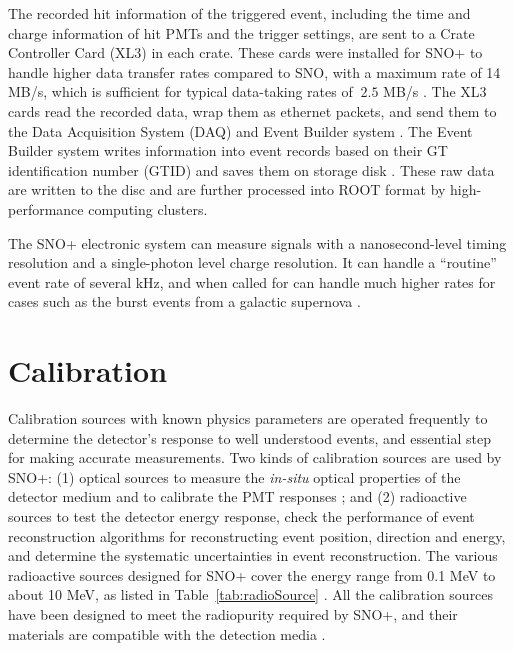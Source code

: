The recorded hit information of the triggered event, including the time and charge information of hit PMTs and the trigger settings, are sent to a Crate Controller Card (XL3) in each crate. These cards were installed for SNO+ to handle higher data transfer rates compared to SNO, with a maximum rate of 14 MB/s, which is sufficient for typical data-taking rates of $~2.5$ MB/s \cite{bonventre2014neutron,rumleskie2021sno+}. The XL3 cards read the recorded data, wrap them as ethernet packets, and send them to the Data Acquisition System (DAQ) and Event Builder system \cite{walker2016study}. The Event Builder system writes information into event records based on their GT identification number (GTID) and saves them on storage disk \cite{snop_jinst}. These raw data are written to the disc and are further processed into ROOT format by high-performance computing clusters.

The SNO+ electronic system can measure signals with a nanosecond-level timing resolution and a single-photon level charge resolution. It can handle a ``routine'' event rate of several kHz, and when called for can handle much higher rates for cases such as the burst events from a galactic supernova \cite{snop_jinst}.

\section{Calibration}\label{sect:calibr}

Calibration sources with known physics parameters are operated frequently to determine the detector's response to well understood events, and essential step for making accurate measurements. Two kinds of calibration sources are used by SNO+: (1) optical sources to measure the \emph{in-situ} optical properties of the detector medium and to calibrate the PMT responses \cite{snop_jinst,anderson2021optical}; and (2) radioactive sources to test the detector energy response, check the performance of event reconstruction algorithms for reconstructing event position, direction and energy, and determine the systematic uncertainties in event reconstruction. The various radioactive sources designed for SNO+ cover the energy range from 0.1 MeV to about 10 MeV, as listed in Table~\ref{tab:radioSource} \cite{snop_jinst}. All the calibration sources have been designed to meet the radiopurity required by SNO+, and their materials are compatible with the detection media \cite{snop_jinst}.

